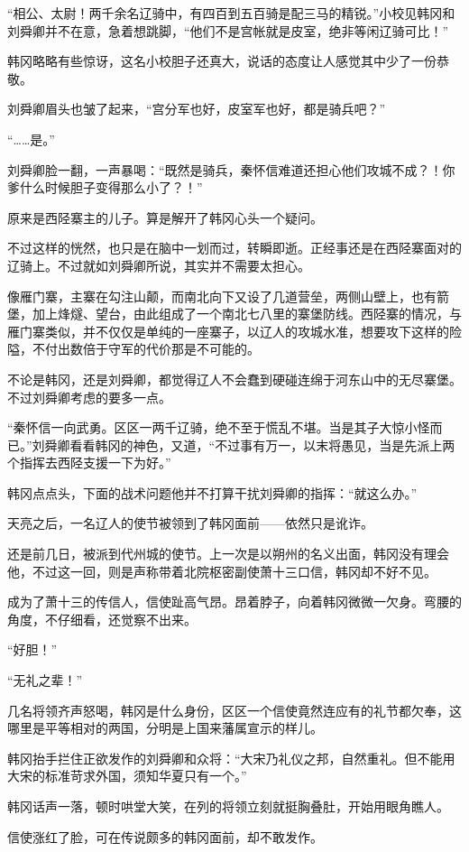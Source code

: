 “相公、太尉！两千余名辽骑中，有四百到五百骑是配三马的精锐。”小校见韩冈和刘舜卿并不在意，急着想跳脚，“他们不是宫帐就是皮室，绝非等闲辽骑可比！”

韩冈略略有些惊讶，这名小校胆子还真大，说话的态度让人感觉其中少了一份恭敬。

刘舜卿眉头也皱了起来，“宫分军也好，皮室军也好，都是骑兵吧？”

“……是。”

刘舜卿脸一翻，一声暴喝：“既然是骑兵，秦怀信难道还担心他们攻城不成？！你爹什么时候胆子变得那么小了？！”

原来是西陉寨主的儿子。算是解开了韩冈心头一个疑问。

不过这样的恍然，也只是在脑中一划而过，转瞬即逝。正经事还是在西陉寨面对的辽骑上。不过就如刘舜卿所说，其实并不需要太担心。

像雁门寨，主寨在勾注山颠，而南北向下又设了几道营垒，两侧山壁上，也有箭堡，加上烽燧、望台，由此组成了一个南北七八里的寨堡防线。西陉寨的情况，与雁门寨类似，并不仅仅是单纯的一座寨子，以辽人的攻城水准，想要攻下这样的险隘，不付出数倍于守军的代价那是不可能的。

不论是韩冈，还是刘舜卿，都觉得辽人不会蠢到硬碰连绵于河东山中的无尽寨堡。不过刘舜卿考虑的要多一点。

“秦怀信一向武勇。区区一两千辽骑，绝不至于慌乱不堪。当是其子大惊小怪而已。”刘舜卿看看韩冈的神色，又道，“不过事有万一，以末将愚见，当是先派上两个指挥去西陉支援一下为好。”

韩冈点点头，下面的战术问题他并不打算干扰刘舜卿的指挥：“就这么办。”

天亮之后，一名辽人的使节被领到了韩冈面前——依然只是讹诈。

还是前几日，被派到代州城的使节。上一次是以朔州的名义出面，韩冈没有理会他，不过这一回，则是声称带着北院枢密副使萧十三口信，韩冈却不好不见。

成为了萧十三的传信人，信使趾高气昂。昂着脖子，向着韩冈微微一欠身。弯腰的角度，不仔细看，还觉察不出来。

“好胆！”

“无礼之辈！”

几名将领齐声怒喝，韩冈是什么身份，区区一个信使竟然连应有的礼节都欠奉，这哪里是平等相对的两国，分明是上国来藩属宣示的样儿。

韩冈抬手拦住正欲发作的刘舜卿和众将：“大宋乃礼仪之邦，自然重礼。但不能用大宋的标准苛求外国，须知华夏只有一个。”

韩冈话声一落，顿时哄堂大笑，在列的将领立刻就挺胸叠肚，开始用眼角瞧人。

信使涨红了脸，可在传说颇多的韩冈面前，却不敢发作。

